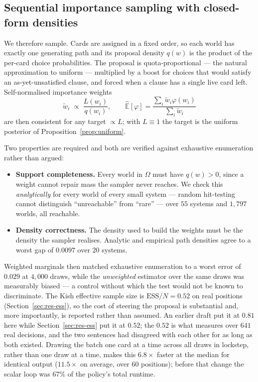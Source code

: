 \documentclass[11pt,a4paper]{article}
\newcommand{\Ex}{\ensuremath{\mathbb{E}}}
\begin{document}
\subsection{Sequential importance sampling with closed-form densities}

We therefore sample. Cards are assigned in a fixed order, so each world has
exactly one generating path and its proposal density $q(w)$ is the product of
the per-card choice probabilities. The proposal is quota-proportional --- the
natural approximation to uniform --- multiplied by a boost for choices that
would satisfy an as-yet-unsatisfied clause, and forced when a clause has a
single live card left. Self-normalised importance weights
\begin{equation}
\tilde{w}_i \;\propto\; \frac{L(w_i)}{q(w_i)},
\qquad
\widehat{\Ex}[\varphi] = \frac{\sum_i \tilde{w}_i \varphi(w_i)}{\sum_i \tilde{w}_i}
\label{eq:snis}
\end{equation}
are then consistent for any target $\propto L$; with $L \equiv 1$ the target is
the uniform posterior of Proposition~\ref{prop:uniform}.

Two properties are required and both are verified against exhaustive
enumeration rather than argued:

\begin{itemize}
\item \textbf{Support completeness.} Every world in $\Omega$ must have
$q(w) > 0$, since a weight cannot repair mass the sampler never reaches. We
check this \emph{analytically} for every world of every small system --- random
hit-testing cannot distinguish ``unreachable'' from ``rare'' --- over $55$
systems and $1{,}797$ worlds, all reachable.
\item \textbf{Density correctness.} The density used to build the weights must
be the density the sampler realises. Analytic and empirical path densities
agree to a worst gap of $0.0097$ over $20$ systems.
\end{itemize}

Weighted marginals then matched exhaustive enumeration to a worst error of
$0.029$ at $4{,}000$ draws, while the \emph{unweighted} estimator over the same
draws was measurably biased --- a control without which the test would not be
known to discriminate. The Kish effective sample size is $\mathrm{ESS}/N = 0.52$
on real positions (Section~\ref{sec:res-ess}), so the cost of steering the
proposal is substantial and, more importantly, is reported rather than assumed.
An earlier draft put it at $0.81$ here while Section~\ref{sec:res-ess} put it at
$0.52$; the $0.52$ is what  measures over $641$
real decisions, and the two sentences had disagreed with each other for as long
as both existed. Drawing the batch one card at a
time across all draws in lockstep, rather than one draw at a time, makes this
$6.8\times$ faster at the median for identical output ($11.5\times$ on
average, over $60$ positions); before that change the scalar loop
was 67\% of the policy's total runtime.
\end{document}
